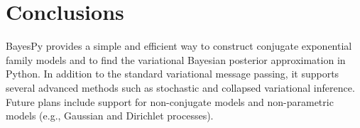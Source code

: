 \documentclass[twoside,11pt]{article}
\begin{document}
\section{Conclusions}

BayesPy provides a simple and efficient way to construct conjugate exponential
family models and to find the variational Bayesian posterior approximation in
Python.
%
In addition to the standard variational message passing, it supports several
advanced methods such as stochastic and collapsed variational inference.  Future
plans include support for non-conjugate models and non-parametric models (e.g.,
Gaussian and Dirichlet processes).







\vskip 0.2in
\small

\end{document}
